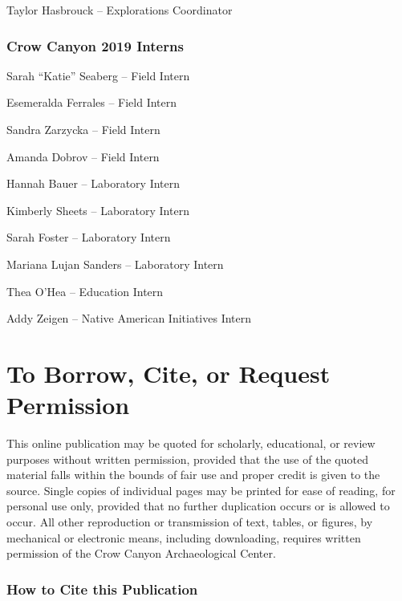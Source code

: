 \documentclass[
  12pt,
]{krantz}
\begin{document}
Taylor Hasbrouck -- Explorations Coordinator

\hypertarget{crow-canyon-2019-interns}{%
\subsection*{Crow Canyon 2019 Interns}\label{crow-canyon-2019-interns}}

Sarah ``Katie'' Seaberg -- Field Intern

Esemeralda Ferrales -- Field Intern

Sandra Zarzycka -- Field Intern

Amanda Dobrov -- Field Intern

Hannah Bauer -- Laboratory Intern

Kimberly Sheets -- Laboratory Intern

Sarah Foster -- Laboratory Intern

Mariana Lujan Sanders -- Laboratory Intern

Thea O'Hea -- Education Intern

Addy Zeigen -- Native American Initiatives Intern

\hypertarget{to-borrow-cite-or-request-permission}{%
\chapter{To Borrow, Cite, or Request Permission}\label{to-borrow-cite-or-request-permission}}

This online publication may be quoted for scholarly, educational, or
review purposes without written permission, provided that the use of the
quoted material falls within the bounds of fair use and proper credit is
given to the source. Single copies of individual pages may be printed
for ease of reading, for personal use only, provided that no further
duplication occurs or is allowed to occur. All other reproduction or
transmission of text, tables, or figures, by mechanical or electronic
means, including downloading, requires written permission of the Crow
Canyon Archaeological Center.

\hypertarget{how-to-cite-this-publication}{%
\subsection*{How to Cite this Publication}\label{how-to-cite-this-publication}}
\end{document}
